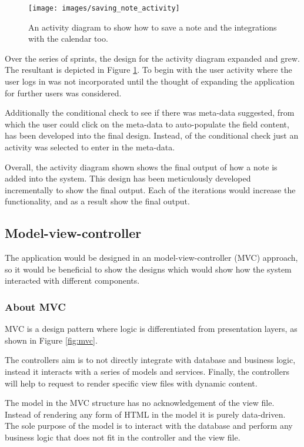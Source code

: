 \begin{figure}[H]
  \centering
  \texttt{[image: images/saving\_note\_activity]}
  \caption{An activity diagram to show how to save a note and the integrations with the calendar too.}
  \label{fig:activity_show_note}
\end{figure}

Over the series of sprints, the design for the activity diagram expanded and grew. The resultant is depicted in Figure \ref{fig:activity_show_note}. To begin with the user activity where the user logs in was not incorporated until the thought of expanding the application for further users was considered.

Additionally the conditional check to see if there was meta-data suggested, from which the user could click on the meta-data to auto-populate the field content, has been developed into the final design. Instead, of the conditional check just an activity was selected to enter in the meta-data.

Overall, the activity diagram shown shows the final output of how a note is added into the system. This design has been meticulously developed incrementally to show the final output. Each of the iterations would increase the functionality, and as a result show the final output.

\subsection{Model-view-controller}
The application would be designed in an model-view-controller (MVC) approach, so it would be beneficial to show the designs which would show how the system interacted with different components.

\subsubsection{About MVC}
MVC is a design pattern where logic is differentiated from presentation layers, as shown in Figure \ref{fig:mvc}.

The controllers aim is to not directly integrate with database and business logic, instead it interacts with a series of models and services. Finally, the controllers will help to request to render specific view files with dynamic content.

The model in the MVC structure has no acknowledgement of the view file. Instead of rendering any form of HTML in the model it is purely data-driven. The sole purpose of the model is to interact with the database and perform any business logic that does not fit in the controller and the view file.

